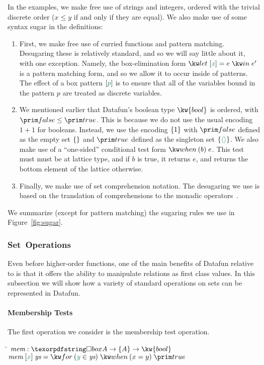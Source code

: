 

In the examples, we make free use of strings and integers, ordered
with the trivial discrete order ($x \leq y$ if and only if they are
equal). We also make use of some syntax sugar in the
definitions:

\begin{enumerate}
\item First, we make free use of curried functions and pattern
  matching. Desugaring these is relatively standard, and so we will
  say little about it, with one exception. Namely, the box-elimination
  form $\eletbox x e e'$ is a pattern matching form, and so we allow
  it to occur inside of patterns. The effect of a box pattern
  $\ebox{p}$ is to ensure that all of the variables bound in the
  pattern $p$ are treated as discrete variables.

\item We mentioned earlier that Datafun's boolean type
  $\kw{bool}$ is ordered, with $\efalse \leq \etrue$.  This is because
  we do not use the usual encoding $1+1$ for booleans. Instead, we use the encoding $\{{1}\}$
  with $\efalse$ defined as the empty set $\eset{}$ and $\etrue$ defined as the
  singleton set $\eset{\etuple{}}$. We also make use of a ``one-sided''
  conditional test form $\ewhen{b}{e}$. This test must must be at lattice
  type, and if $b$ is true, it returns $e$, and returns the bottom
  element of the lattice otherwise. 
  
\item Finally, we make use of set comprehension notation. The
  desugaring we use is based on the translation of comprehensions to
  the monadic operators~\cite{wadler-monad-comprehensions}.
\end{enumerate}
We summarize (except for pattern matching) the sugaring rules we use in
Figure~\ref{fig:sugar}. 

\subsubsection{Set\, Operations}

Even before higher-order functions, one of the main benefits of
Datafun relative to is that it offers the ability to manipulate relations
as first class values. In this subsection we will show how a variety
of standard operations on sets can be represented in Datafun. 

\paragraph{Membership Tests} The first operation we consider is the
membership test operation. 
\begin{tabbing}
  \qquad\=\+ \kill
  $\name{mem} : \iso A \to \tset A \to \kw{bool}$ \\
  $\name{mem}\;\ebox{x} \; \name{ys} = \efor{y}{\name{ys}}\ewhen{x = y}{\etrue}$ 
\end{tabbing}

